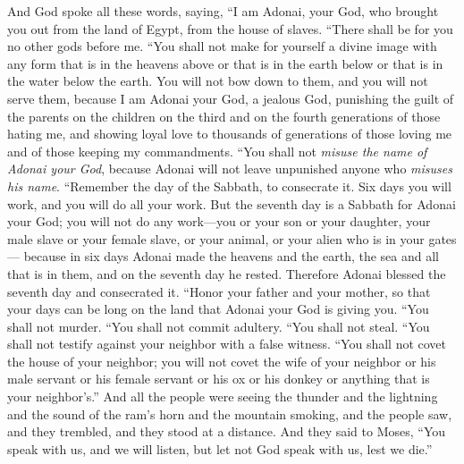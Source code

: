 \begin{biblechapter} %
 And God spoke all these words, saying,
\verse “I am Adonai, your God, who brought you out from the land of Egypt, from the house of slaves.
\verse “There shall be for you no other gods before me.
\verse “You shall not make for yourself a divine image with any form that is in the heavens above or that is in the earth below or that is in the water below the earth.
\verse You will not bow down to them, and you will not serve them, because I am Adonai your God, a jealous God, punishing the guilt of the parents on the children on the third and on the fourth generations of those hating me,
\verse and showing loyal love to thousands of generations of those loving me and of those keeping my commandments.
\verse “You shall not \textit{misuse the name of Adonai your God}, because Adonai will not leave unpunished anyone who \textit{misuses his name}.
\verse “Remember the day of the Sabbath, to consecrate it.
\verse Six days you will work, and you will do all your work.
\verse But the seventh day is a Sabbath for Adonai your God; you will not do any work—you or your son or your daughter, your male slave or your female slave, or your animal, or your alien who is in your gates—
\verse because in six days Adonai made the heavens and the earth, the sea and all that is in them, and on the seventh day he rested. Therefore Adonai blessed the seventh day and consecrated it.
\verse “Honor your father and your mother, so that your days can be long on the land that Adonai your God is giving you.
\verse “You shall not murder.
\verse “You shall not commit adultery.
\verse “You shall not steal.
\verse “You shall not testify against your neighbor with a false witness.
\verse “You shall not covet the house of your neighbor; you will not covet the wife of your neighbor or his male servant or his female servant or his ox or his donkey or anything that is your neighbor’s.”
\verse And all the people were seeing the thunder and the lightning and the sound of the ram’s horn and the mountain smoking, and the people saw, and they trembled, and they stood at a distance.
\verse And they said to Moses, “You speak with us, and we will listen, but let not God speak with us, lest we die.”

\end{biblechapter}
